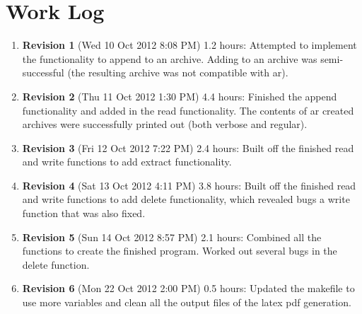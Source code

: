 \documentclass{article}
\begin{document}
\section{Work Log}
\begin{enumerate}
\item \textbf{Revision 1} (Wed 10 Oct 2012 8:08 PM) 1.2 hours:  Attempted to implement the functionality to append to an archive.  Adding to an archive was semi-successful (the resulting archive was not compatible with ar).
\item \textbf{Revision 2} (Thu 11 Oct 2012 1:30 PM) 4.4 hours:  Finished the append functionality and added in the read functionality.  The contents of ar created archives were successfully printed out (both verbose and regular).
\item \textbf{Revision 3} (Fri 12 Oct 2012 7:22 PM) 2.4 hours:  Built off the finished read and write functions to add extract functionality.
\item \textbf{Revision 4} (Sat 13 Oct 2012 4:11 PM) 3.8 hours:  Built off the finished read and write functions to add delete functionality, which revealed bugs a write function that was also fixed.
\item \textbf{Revision 5} (Sun 14 Oct 2012 8:57 PM) 2.1 hours:  Combined all the functions to create the finished program.  Worked out several bugs in the delete function.  
\item \textbf{Revision 6} (Mon 22 Oct 2012 2:00 PM) 0.5 hours:  Updated the makefile to use more variables and clean all the output files of the latex pdf generation.
\end{enumerate}
\end{document}
